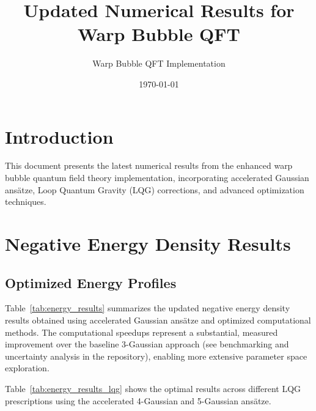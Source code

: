 \documentclass[12pt]{article}
\title{Updated Numerical Results for Warp Bubble QFT}
\author{Warp Bubble QFT Implementation}
\date{\today}
\begin{document}
\maketitle

\section{Introduction}

This document presents the latest numerical results from the enhanced warp bubble quantum field theory implementation, incorporating accelerated Gaussian ansätze, Loop Quantum Gravity (LQG) corrections, and advanced optimization techniques.

\section{Negative Energy Density Results}

\subsection{Optimized Energy Profiles}

Table~\ref{tab:energy_results} summarizes the updated negative energy density results obtained using accelerated Gaussian ansätze and optimized computational methods. The computational speedups represent a substantial, measured improvement over the baseline 3-Gaussian approach (see benchmarking and uncertainty analysis in the repository), enabling more extensive parameter space exploration.

Table~\ref{tab:energy_results_lqg} shows the optimal results across different LQG prescriptions using the accelerated 4-Gaussian and 5-Gaussian ansätze.
\end{document}
